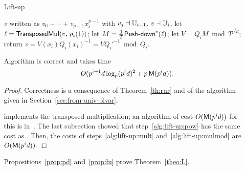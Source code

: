 \begin{algorithm}
  \caption{Lift-up}
  \begin{algorithmic}[1]
    \REQUIRE $v$ written as $v_0+\cdots+v_{p-1}x_i^{p-1}$ with $v_j \dashv \mathbb{U}_{i-1}$.
    \ENSURE $v\dashv \mathbb{U}_i$.
    \STATE \label{alg:lift-up:transmul} let $\ell = {\sf TransposedMul}(v,\,\rho_i(1))$;
    \STATE \label{alg:lift-up:pow} let $M=\frac{1}{T}{\text{\sf Push-down}}^\ast(\ell)$;
    \STATE \label{alg:lift-up:mult} let $V = Q_iM \bmod T^{p^id}$;
    \STATE \label{alg:lift-up:mulmod} return $v=V(x_i)Q_i(x_i)^{-1} = V {Q_i'}^{-1} \bmod Q_i$.
  \end{algorithmic}
\end{algorithm}

\begin{proposition}\label{prop:lu}
  Algorithm  is correct and takes time
  \begin{equation}
    \label{eq:85}
    O(p^{i+1}d\log_p(p^id)^2+p\,\mathsf{M}(p^{i}d))
    \text{.}    
  \end{equation}
\end{proposition}
\begin{proof}
  Correctness is a consequence of Theorem~\ref{th:rur} and of the
  algorithm given in Section~\ref{sec:from-univ-bivar}.

   implements the transposed multiplication; an
  algorithm of cost $O(\mathsf{M}(p^id))$ for this is
  in~\cite[Corollary~2]{pascal+schost06}\todo.  The last subsection
  showed that step~\ref{alg:lift-up:pow} has the same cost as
  . Then, the costs of steps~\ref{alg:lift-up:mult}
  and~\ref{alg:lift-up:mulmod} are $O(\mathsf{M}(p^id))$.
\end{proof}

Propositions~\ref{prop:pd} and~\ref{prop:lu} prove
Theorem~\ref{theo:L}.


